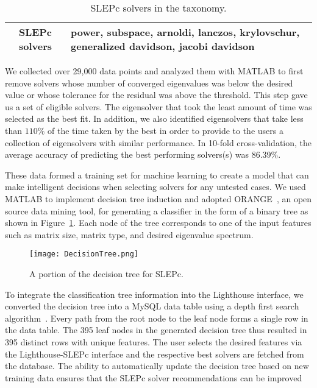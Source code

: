 \documentclass{sig-alternate}
\begin{document}
\begin{table}[!htbp]
\centering
\caption{SLEPc solvers in the taxonomy.}
\label{table_solvers}
\begin{tabular}{|c|p{5.3cm}|}
\hline
\textbf{SLEPc solvers} & power, subspace, arnoldi, lanczos, krylovschur, generalized davidson, jacobi davidson\\ \hline
\end{tabular}
\end{table}

We collected over 29,000 data points and analyzed them with MATLAB to first remove solvers 
whose number of converged 
eigenvalues was below the
desired value or whose tolerance for the residual was above the threshold. This step gave us a set of eligible solvers. The eigensolver that
took the least amount of time was selected as the best fit. In addition, 
we also identified eigensolvers that take less than $110\%$ of the time taken by the best in order
to provide to the users a collection of eigensolvers with similar performance. In 10-fold cross-validation, the average accuracy 
of predicting the best performing solvers(s) was 86.39\%.



These data formed a training set for machine learning to create a model that can 
make intelligent decisions when selecting solvers for
any untested cases. We used MATLAB to implement decision tree induction and adopted ORANGE~\cite{orange:Online},
an open source data mining tool, for generating a classifier in the form of a binary tree as shown in Figure~\ref{fig:DecisionTree}.
Each node of the tree corresponds to one of the input features such as matrix size, matrix type, and desired eigenvalue spectrum.

\begin{figure}[ht]
\centering
\texttt{[image: DecisionTree.png]}
\vspace{-5pt}
\caption{A portion of the decision tree for SLEPc.}
\label{fig:DecisionTree}
\end{figure}


To integrate the classification tree information into the Lighthouse interface, we converted the decision tree into a MySQL 
data table using a depth first search algorithm~\cite{Skiena:1997}. Every path from the root node to the leaf node forms a 
single row in the data table. The 395 leaf nodes in the generated
decision tree thus resulted in 395 distinct rows with unique features. 
The user selects the desired features via the Lighthouse-SLEPc interface and the respective best solvers are fetched from the database.
The ability to automatically update the decision tree based on new training data ensures that the SLEPc 
solver recommendations can be improved  
\end{document}
